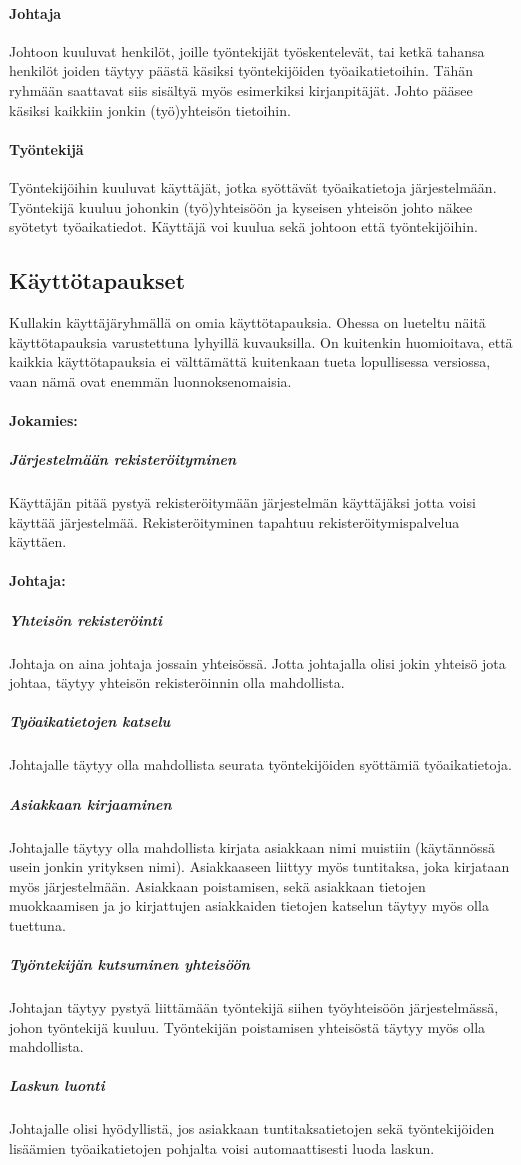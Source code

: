 \documentclass[a4paper, 12pt finnish]{article}
\begin{document}
\paragraph{Johtaja} Johtoon kuuluvat henkilöt, joille työntekijät
työskentelevät, tai ketkä tahansa henkilöt joiden täytyy päästä käsiksi
työntekijöiden työaikatietoihin. Tähän ryhmään saattavat siis sisältyä myös
esimerkiksi kirjanpitäjät. Johto pääsee käsiksi kaikkiin jonkin
(työ)yhteisön tietoihin.
\paragraph{Työntekijä} Työntekijöihin kuuluvat käyttäjät, jotka syöttävät
työaikatietoja järjestelmään. Työntekijä kuuluu johonkin (työ)yhteisöön
ja kyseisen yhteisön johto näkee syötetyt työaikatiedot. Käyttäjä voi
kuulua sekä johtoon että työntekijöihin.

\subsection{Käyttötapaukset} Kullakin käyttäjäryhmällä on omia
käyttötapauksia. Ohessa on lueteltu näitä käyttötapauksia varustettuna
lyhyillä kuvauksilla. On kuitenkin huomioitava, että kaikkia
käyttötapauksia ei välttämättä kuitenkaan tueta lopullisessa versiossa,
vaan nämä ovat enemmän luonnoksenomaisia.

\paragraph{Jokamies:}
\subparagraph{Järjestelmään rekisteröityminen} Käyttäjän pitää pystyä
rekisteröitymään järjestelmän käyttäjäksi jotta voisi käyttää
järjestelmää. Rekisteröityminen tapahtuu rekisteröitymispalvelua käyttäen.

\paragraph{Johtaja:}
\subparagraph{Yhteisön rekisteröinti} Johtaja on aina johtaja jossain
yhteisössä. Jotta johtajalla olisi jokin yhteisö jota johtaa, täytyy
yhteisön rekisteröinnin olla mahdollista.
\subparagraph{Työaikatietojen katselu} Johtajalle täytyy olla mahdollista
seurata työntekijöiden syöttämiä työaikatietoja.
\subparagraph{Asiakkaan kirjaaminen} Johtajalle täytyy olla mahdollista
kirjata asiakkaan nimi muistiin (käytännössä usein jonkin yrityksen nimi).
Asiakkaaseen liittyy myös tuntitaksa, joka kirjataan myös järjestelmään. 
Asiakkaan poistamisen, sekä asiakkaan tietojen muokkaamisen ja jo 
kirjattujen asiakkaiden tietojen katselun täytyy myös olla tuettuna.
\subparagraph{Työntekijän kutsuminen yhteisöön} Johtajan täytyy pystyä
liittämään työntekijä siihen työyhteisöön järjestelmässä, johon 
työntekijä kuuluu. Työntekijän poistamisen yhteisöstä täytyy myös olla
mahdollista.
\subparagraph{Laskun luonti} Johtajalle olisi hyödyllistä, jos asiakkaan
tuntitaksatietojen sekä työntekijöiden lisäämien työaikatietojen pohjalta
voisi automaattisesti luoda laskun.
\end{document}
